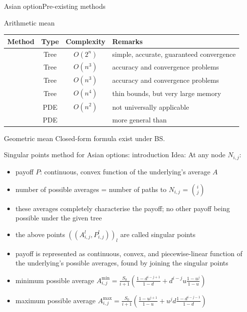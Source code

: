 \documentclass[utf8,t,xcolor=svgnames]{beamer}
\begin{document}
\begin{frame}{Asian option}{Pre-existing methods}
	\begin{block}{Arithmetic mean}
		\begin{tabular}{cccl}
			\toprule
			Method  &  Type  &  Complexity  &  Remarks  \\
			\midrule
			\cite{Cox1979}  &  Tree  &  $ O(2^n) $  &  simple, accurate, guaranteed convergence  \\
			\cite{Hull1993}  &  Tree  &  $ O(n^3) $  &  accuracy and convergence problems  \\
			\cite{Barraquand1996}  &  Tree  &  $ O(n^3) $  &  accuracy and convergence problems  \\
			\cite{Chalasani1999}  &  Tree  &  $ O(n^4) $  &  thin bounds, but very large memory  \\
			\cite{Vecer2001}  &  PDE  &  $ O(n^2) $  &  not universally applicable  \\
			\cite{dHalluin2005}  &  PDE  &    &  more general than \cite{Vecer2001} \\
			\bottomrule
		\end{tabular}
	\end{block}
	
	\begin{block}{Geometric mean}
		Closed-form formula exist under BS.
	\end{block}
\end{frame}


\begin{frame}{Singular points method for Asian options: introduction}
	Idea: At any node $ N_{i,j} $:
	\begin{itemize}
		\item payoff $ P $: continuous, convex function of the underlying's average $ A $
		\item number of possible averages = number of paths to $ N_{i,j} $ = $ \binom{i}{j} $
		\item these averages completely characterise the payoff; no other payoff being possible under the given tree
		\item the above points $ ((A_{i,j}^l, P_{i,j}^l))_l $ are called \alert{singular points}
		\item payoff is represented as continuous, convex, and piecewise-linear function of the underlying's possible averages, found by joining the singular points
		\item minimum possible average $ A_{i,j}^{\min} = \frac{S_0}{i+1} \left( \frac{1 - d^{i-j+1}}{1-d} + d^{i-j} u \frac{1 - u^{j}}{1-u} \right)$
		\item maximum possible average $ A_{i,j}^{\max} = \frac{S_0}{i+1} \left( \frac{1 - u^{j+1}}{1-u} + u^{j} d \frac{1 - d^{i-j-1}}{1-d} \right) $
	\end{itemize}
\end{frame}
\end{document}
